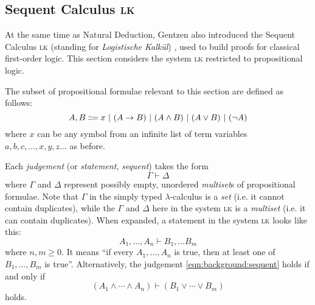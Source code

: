 \subsection{Sequent Calculus \textsc{lk}}
At the same time as Natural Deduction, Gentzen also introduced the Sequent Calculus \textsc{lk} (standing for \textit{Logistische Kalkül}) \cite{gentzen:1969}, used to build proofs for classical first-order logic. This section considers the system \textsc{lk} restricted to propositional logic.

\begin{definition}
    The subset of propositional formulae relevant to this section are defined as follows:
    \[
        A, B \Coloneqq x \ |\  (A \to B) \ |\  (A \land B) \ |\  (A \lor B) \ |\  (\lnot A)
    \]
    where $x$ can be any symbol from an infinite list of term variables $a, b, c, \ldots, x, y, z \ldots$ as before.
\end{definition}
\begin{definition}
Each \textit{judgement} (or \textit{statement}, \textit{sequent}) takes the form
\[
    \Gamma \vdash \Delta
\]
where $\Gamma$ and $\Delta$ represent possibly empty, unordered \textit{multiset}s of propositional formulae. Note that $\Gamma$ in the simply typed $\lambda$-calculus is a \textit{set} (i.e. it cannot contain duplicates), while the $\Gamma$ and $\Delta$ here in the system \textsc{lk} is a \textit{multiset} (i.e. it can contain duplicates). When expanded, a statement in the system \textsc{lk} looks like this:
\begin{equation}
    \label{eqn:background:sequent}
    A_1, \ldots, A_n \vdash B_1, \ldots B_m
\end{equation}
where $n, m \geq 0$. It means ``if every $A_1, \ldots, A_n$ is true, then at least one of $B_1, \ldots, B_m$ is true''. Alternatively, the judgement \ref{eqn:background:sequent} holds if and only if
\[
    (A_1 \land \cdots \land A_n) \vdash (B_1 \lor \cdots \lor B_m)
\]
holds.
\end{definition}
